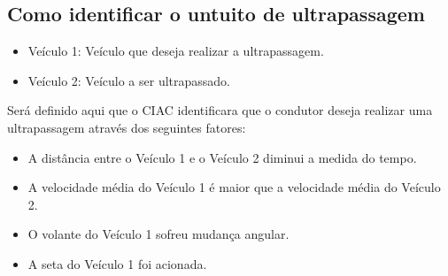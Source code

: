 \subsection{Como identificar o untuito de ultrapassagem}

\begin{itemize}
  \item Veículo 1: Veículo que deseja realizar a ultrapassagem.
  \item Veículo 2: Veículo a ser ultrapassado.
\end{itemize}

Será definido aqui que o CIAC identificara que o condutor deseja realizar uma ultrapassagem através dos seguintes fatores:

\begin{itemize}
  \item A distância entre o Veículo 1 e o Veículo 2 diminui a medida do tempo.
  \item A velocidade média do Veículo 1 é maior que a velocidade média do Veículo 2.
  \item O volante do Veículo 1 sofreu mudança angular.
  \item A seta do Veículo 1 foi acionada.
\end{itemize}
